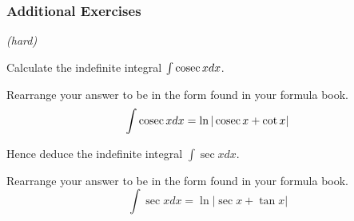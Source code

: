 
\subsubsection{Additional Exercises}
\begin{example}
    \emph{(hard)}

    Calculate the indefinite integral $\int \operatorname{cosec} x dx$.

    Rearrange your answer to be in the form found in your formula book. 
    \[\int \operatorname{cosec} x dx = \ln | \operatorname{cosec} x + \cot x|\]

    Hence deduce the indefinite integral $\int \sec x dx$.

    Rearrange your answer to be in the form found in your formula book.
    \[\int \sec x dx = \ln | \sec x + \tan x|\]
\end{example}
